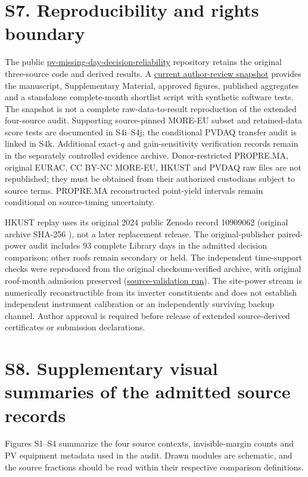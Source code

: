 \documentclass[11pt]{article}
\begin{document}
\section*{S7. Reproducibility and rights boundary}
The public \href{https://github.com/shaikhamalkawi-ux/pv-missing-day-decision-reliability}{pv-missing-day-decision-reliability} repository retains the original three-source code and derived results. A \href{https://github.com/shaikhamalkawi-ux/pv-missing-day-decision-reliability/tree/main/release/2026-11-22-r55-ep2}{current author-review snapshot} provides the manuscript, Supplementary Material, approved figures, published aggregates and a standalone complete-month shortlist script with synthetic software tests. The snapshot is not a complete raw-data-to-result reproduction of the extended four-source audit. Supporting source-pinned MORE-EU subset and retained-data score tests are documented in S4i--S4j; the conditional PVDAQ transfer audit is linked in S4k. Additional exact-$q$ and gain-sensitivity verification records remain in the separately controlled evidence archive. Donor-restricted PROPRE.MA, original EURAC, CC BY-NC MORE-EU, HKUST and PVDAQ raw files are not republished; they must be obtained from their authorized custodians subject to source terms. PROPRE.MA reconstructed point-yield intervals remain conditional on source-timing uncertainty.

HKUST replay uses its original 2024 public Zenodo record 10909062 (original archive SHA-256 \texttt{}), not a later replacement release. The original-publisher paired-power audit includes 93 complete Library days in the admitted decision comparison; other roofs remain secondary or held. The independent time-support checks were reproduced from the original checksum-verified archive, with original roof-month admission preserved (\href{https://github.com/shaikhamalkawi-ux/pv-missing-day-decision-reliability/actions/runs/43821197373}{source-validation run}). The site-power stream is numerically reconstructible from its inverter constituents and does not establish independent instrument calibration or an independently surviving backup channel. Author approval is required before release of extended source-derived certificates or submission declarations.


\medskip
\section*{S8. Supplementary visual summaries of the admitted source records}
Figures S1--S4 summarize the four source contexts, invisible-margin counts and PV equipment metadata used in the audit. Drawn modules are schematic, and the source fractions should be read within their respective comparison definitions.
\setcounter{figure}{0}
\renewcommand{\thefigure}{S\arabic{figure}}
\end{document}
